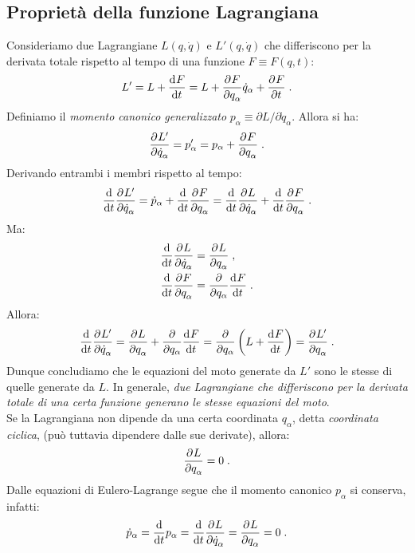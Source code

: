 \subsection{Proprietà della funzione Lagrangiana}
Consideriamo due Lagrangiane $L(q,\dot{q})$ e $L'(q,\dot{q})$ che differiscono per la derivata totale rispetto al tempo di una funzione $F\equiv F(q,t)$:
\begin{equation}
L' = L+\frac{\mathrm{d}^{}F}{\mathrm{d}t^{}}=L+\frac{\partial^{}F}{\partial q_{\alpha}^{}}\dot{q}_{\alpha}+\frac{\partial^{}F}{\partial t^{}}\;.
\end{equation}
Definiamo il \textit{momento canonico generalizzato} $p_{\alpha}\equiv\partial L/\partial\dot{q}_{\alpha}$. Allora si ha:
\begin{equation}
\frac{\partial^{}L'}{\partial \dot{q}_{\alpha}^{}}=p_{\alpha}'=p_{\alpha}+\frac{\partial^{}F}{\partial q_{\alpha}^{}}\;.
\end{equation}
Derivando entrambi i membri rispetto al tempo:
\begin{equation}
\frac{\mathrm{d}}{\mathrm{d}t}\frac{\partial^{}L'}{\partial \dot{q}_{\alpha}^{}}=\dot{p}_{\alpha}+\frac{\mathrm{d}}{\mathrm{d}t}\frac{\partial^{}F}{\partial q_{\alpha}^{}}= \frac{\mathrm{d}}{\mathrm{d}{t}}\frac{\partial^{}L}{\partial \dot{q}_{\alpha}^{}}+\frac{\mathrm{d}}{\mathrm{d}{t}}\frac{\partial^{}F}{\partial q_{\alpha}^{}}\;.
\end{equation}
Ma:
\begin{align}
\frac{\mathrm{d}}{\mathrm{d}{t}}\frac{\partial^{}L}{\partial \dot{q}_{\alpha}^{}}&=\frac{\partial^{}L}{\partial q_{\alpha}^{}}\;, \\
\frac{\mathrm{d}}{\mathrm{d}{t}}\frac{\partial^{}F}{\partial q_{\alpha}^{}} &= \frac{\partial}{\partial q_{\alpha}}\frac{\mathrm{d}^{}F}{\mathrm{d}t^{}}\;.
\end{align}
Allora:
\begin{equation}
\frac{\mathrm{d}}{\mathrm{d}{t}}\frac{\partial^{}L'}{\partial \dot{q}_{\alpha}^{}}=\frac{\partial^{}L}{\partial q_{\alpha}^{}}+\frac{\partial}{\partial q_{\alpha}}\frac{\mathrm{d}^{}F}{\mathrm{d}t^{}}=\frac{\partial}{\partial q_{\alpha}}\left(L+\frac{\mathrm{d}^{}F}{\mathrm{d}t^{}}\right)=\frac{\partial^{}L'}{\partial q_{\alpha}^{}}\;.
\end{equation}
Dunque concludiamo che le equazioni del moto generate da $L'$ sono le stesse di quelle generate da $L$. In generale, \textit{due Lagrangiane che differiscono per la derivata totale di una certa funzione generano le stesse equazioni del moto}. \\

Se la Lagrangiana non dipende da una certa coordinata $q_{\alpha}$, detta \textit{coordinata ciclica}, (può tuttavia dipendere dalle sue derivate), allora:
\begin{equation}
\frac{\partial^{}L}{\partial q_{\alpha}^{}}=0\;.
\end{equation}
Dalle equazioni di Eulero-Lagrange segue che il momento canonico $p_{\alpha}$ si conserva, infatti:
\begin{equation}
\dot{p}_{\alpha}=\frac{\mathrm{d}}{\mathrm{d}t}p_{\alpha}=\frac{\mathrm{d}}{\mathrm{d}t}\frac{\partial^{}L}{\partial \dot{q}_{\alpha}^{}}=\frac{\partial^{}L}{\partial q_{\alpha}^{}}=0\;.
\end{equation}
\pagebreak
